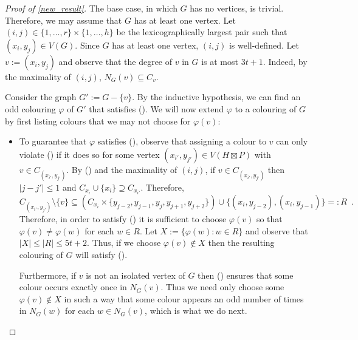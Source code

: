 \documentclass{patmorin}
\begin{document}
\begin{proof}[Proof of \cref{new_result}]
  The base case, in which $G$ has no vertices, is trivial. Therefore, we may assume that $G$ has at least one vertex.  Let $(i,j)\in\{1,\ldots,r\}\times\{1,\ldots,h\}$ be the lexicographically largest pair such that $(x_i,y_j)\in V(G)$.  Since $G$ has at least one vertex, $(i,j)$ is well-defined.  Let $v:=(x_i,y_j)$ and observe that the degree of $v$ in $G$ is at most $3t+1$. Indeed, by the maximality of $(i,j)$,  $N_G(v)\subseteq C_v$.

  Consider the graph $G':= G-\{v\}$.  By the inductive hypothesis, we can find an odd colouring $\varphi$ of $G'$ that satisfies ().  We will now extend $\varphi$ to a colouring of $G$ by first listing colours that we may not choose for $\varphi(v)$:
  \begin{itemize}
    \item To guarantee that $\varphi$ satisfies (), observe that assigning a colour to $v$ can only violate () if it does so for some vertex $(x_{i'},y_{j'})\in V(H\boxtimes P)$ with $v\in C_{(x_{i'},y_{j'})}$.  By () and the maximality of $(i,j)$, if $v\in C_{(x_{i'},y_{j'})}$ then $|j-j'|\le 1$ and $C_{x_{i}}\cup\{x_i\}\supseteq C_{x_{i'}}$.  Therefore,
    \[
        C_{(x_{i'},y_{j'})}\setminus\{v\}\subseteq
          \left(C_{x_i} \times \{y_{j-2},y_{j-1},y_j,y_{j+1},y_{j+2}\}\right)
          \cup \{(x_i,y_{j-2}),(x_i,y_{j-1})\} =: R \enspace .
    \]
    Therefore, in order to satisfy () it is sufficient to choose $\varphi(v)$ so that $\varphi(v)\neq\varphi(w)$ for each $w\in R$.  Let $X:=\{\varphi(w): w\in R\}$ and observe that $|X|\le |R| \le 5t+2$.  Thus, if we choose $\varphi(v)\not\in X$ then the resulting colouring of $G$ will satisfy ().

    Furthermore, if $v$ is not an isolated vertex of $G$ then () ensures that some colour occurs exactly once in $N_G(v)$. Thus we need only choose some $\varphi(v)\not\in X$ in such a way that some colour appears an odd number of times in $N_G(w)$ for each $w\in N_G(v)$, which is what we do next.


\end{itemize}
\end{proof}
\end{document}
